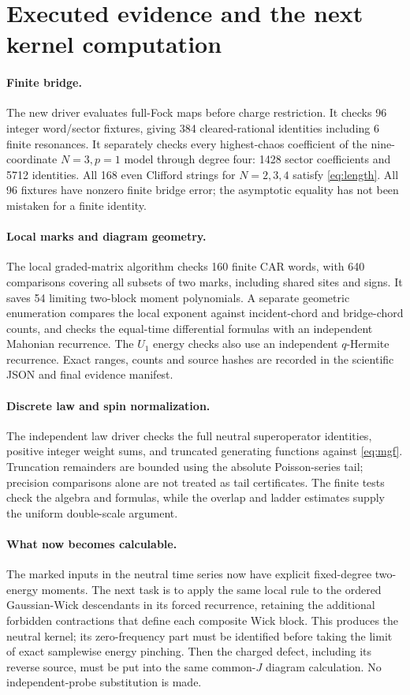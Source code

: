 \documentclass[11pt]{article}
\begin{document}
\newpage
\section{Executed evidence and the next kernel computation}
\paragraph{Finite bridge.}
The new driver evaluates full-Fock maps before charge restriction.
It checks 96 integer word/sector fixtures, giving 384 cleared-rational
identities including 6 finite resonances. It separately checks every
highest-chaos coefficient of the nine-coordinate $N=3,p=1$ model
through degree four: 1428 sector coefficients and 5712 identities.
All 168 even Clifford strings for $N=2,3,4$ satisfy
\eqref{eq:length}. All 96 fixtures have nonzero finite bridge error;
the asymptotic equality has not been mistaken for a finite identity.

\paragraph{Local marks and diagram geometry.}
The local graded-matrix algorithm checks 160 finite CAR words,
with 640 comparisons covering all subsets of two marks, including
shared sites and signs. It saves 54 limiting two-block moment
polynomials. A separate geometric enumeration compares the local
exponent against incident-chord and bridge-chord counts, and checks
the equal-time differential formulas with an independent Mahonian
recurrence. The $U_1$ energy checks also use an independent
$q$-Hermite recurrence. Exact ranges, counts and source hashes are
recorded in the scientific JSON and final evidence manifest.

\paragraph{Discrete law and spin normalization.}
The independent law driver checks the full neutral superoperator
identities, positive integer weight sums, and truncated generating
functions against \eqref{eq:mgf}. Truncation remainders are bounded
using the absolute Poisson-series tail; precision comparisons alone
are not treated as tail certificates. The finite tests check the
algebra and formulas, while the overlap and ladder estimates supply
the uniform double-scale argument.

\paragraph{What now becomes calculable.}
The marked inputs in the neutral time series now have explicit
fixed-degree two-energy moments. The next task is to apply the same
local rule to the ordered Gaussian-Wick descendants in its forced
recurrence, retaining the additional forbidden contractions that
define each composite Wick block. This produces the neutral kernel;
its zero-frequency part must be identified before taking the limit
of exact samplewise energy pinching. Then the charged defect,
including its reverse source, must be put into the same common-$J$
diagram calculation. No independent-probe substitution is made.
\end{document}
